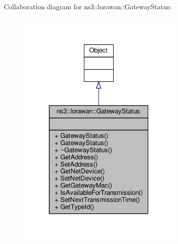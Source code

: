 Collaboration diagram for ns3\+:\+:lorawan\+:\+:Gateway\+Status\+:
\nopagebreak
\begin{figure}[H]
\begin{center}
\leavevmode
\includegraphics[width=232pt]{classns3_1_1lorawan_1_1GatewayStatus__coll__graph}
\end{center}
\end{figure}
